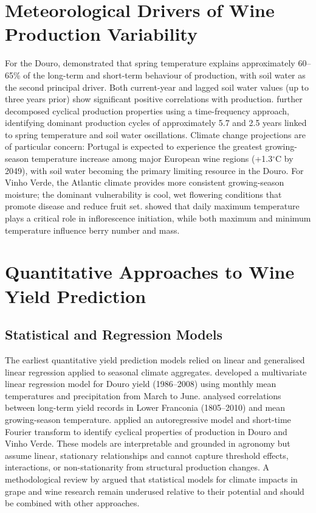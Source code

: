 \section{Meteorological Drivers of Wine Production Variability}\label{sec:meteorological_drivers_of_wine}

For the Douro, \citet{Cunha2016} demonstrated that spring temperature explains approximately 60--65\% of the long-term and short-term behaviour of production, with soil water as the second principal driver. Both current-year and lagged soil water values (up to three years prior) show significant positive correlations with production. \citet{Cunha2020} further decomposed cyclical production properties using a time-frequency approach, identifying dominant production cycles of approximately 5.7 and 2.5 years linked to spring temperature and soil water oscillations. Climate change projections are of particular concern: Portugal is expected to experience the greatest growing-season temperature increase among major European wine regions (+1.3$^\circ$C by 2049), with soil water becoming the primary limiting resource in the Douro. For Vinho Verde, the Atlantic climate provides more consistent growing-season moisture; the dominant vulnerability is cool, wet flowering conditions that promote disease and reduce fruit set. \citet{Zhu2020} showed that daily maximum temperature plays a critical role in inflorescence initiation, while both maximum and minimum temperature influence berry number and mass.


\section{Quantitative Approaches to Wine Yield Prediction}\label{sec:quantitative_approaches_to_wine}


\subsection{Statistical and Regression Models}\label{sub:statistical_and_regression_models}

The earliest quantitative yield prediction models relied on linear and generalised linear regression applied to seasonal climate aggregates. \citet{Santos2011} developed a multivariate linear regression model for Douro yield (1986--2008) using monthly mean temperatures and precipitation from March to June. \citet{Bock2013} analysed correlations between long-term yield records in Lower Franconia (1805--2010) and mean growing-season temperature. \citet{Cunha2012} applied an autoregressive model and short-time Fourier transform to identify cyclical properties of production in Douro and Vinho Verde. These models are interpretable and grounded in agronomy but assume linear, stationary relationships and cannot capture threshold effects, interactions, or non-stationarity from structural production changes. A methodological review by \citet{Fraga2024} argued that statistical models for climate impacts in grape and wine research remain underused relative to their potential and should be combined with other approaches.



